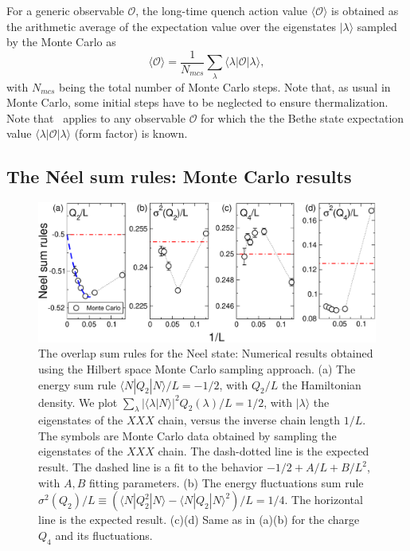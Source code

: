 \documentclass[11pt]{iopart}
\begin{document}
For a generic observable ${\mathcal O}$, the long-time quench action value $\langle{
\mathcal O}\rangle$ is obtained as the arithmetic average of the expectation value 
over the eigenstates $|\lambda\rangle$ sampled by the Monte Carlo as 
%
\begin{equation}
\label{qamc-obs}
\langle{\mathcal O}\rangle=\frac{1}{N_{mcs}}\sum\limits_{\lambda}\langle\lambda|
{\mathcal O}|\lambda\rangle, 
\end{equation}
%
with $N_{mcs}$ being the total number of Monte Carlo steps. Note that, as usual in 
Monte Carlo, some initial steps have to be neglected to ensure thermalization. 
Note that~ applies to any observable ${\mathcal O}$ for which the 
the Bethe state expectation value $\langle\lambda|{\mathcal O}|\lambda\rangle$ 
(form factor) is known. 


\subsection{The N\'eel sum rules: Monte Carlo results}
\label{sec:6.2}

\begin{figure}[t]
\begin{center}
\includegraphics[width=.9\textwidth]{./draft_figs/QAMC_Obs_Neel}
\end{center}
\caption{The overlap sum rules for the Neel state: Numerical results 
 obtained using the Hilbert space Monte Carlo sampling approach. (a) 
 The energy sum rule $\langle N|Q_2|N\rangle/L=-1/2$, with $Q_2/L$ 
 the Hamiltonian density. We plot $\sum_{\lambda}|\langle\lambda|
 N\rangle|^2Q_2(\lambda)/L=1/2$, with $|\lambda\rangle$ the 
 eigenstates of the $XXX$ chain, versus the inverse chain length $1/L$. 
 The symbols are Monte Carlo data obtained by sampling the eigenstates 
 of the $XXX$ chain. The dash-dotted line is the expected result. The 
 dashed line is a fit to the behavior $-1/2+A/L+B/L^2$, with $A,B$ 
 fitting parameters. (b) The energy fluctuations sum rule $\sigma^2(Q_2)/
 L\equiv(\langle N|Q_2^2|N\rangle-\langle N|Q_2|N\rangle^2)/L=1/4$. The 
 horizontal line is the expected result. (c)(d) Same as in (a)(b) for 
 the charge $Q_4$ and its fluctuations. 
}
\label{fig3:neel-qamc-sr}
\end{figure}
\end{document}
